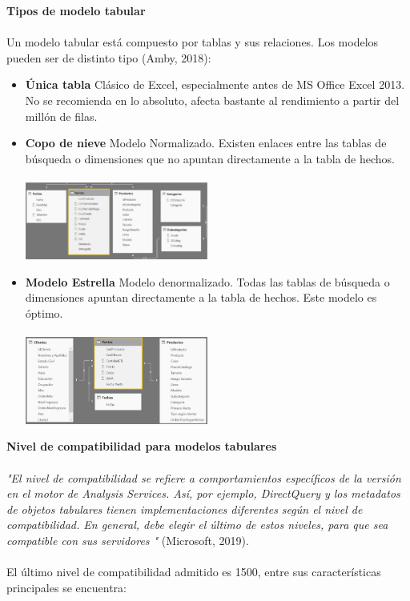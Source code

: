 \documentclass[twoside,twocolumn]{article}
\begin{document}
\begin{enumerate}
\textbf{Tipos de modelo tabular}
\\ \\
Un modelo tabular está compuesto por tablas y sus relaciones.  Los modelos pueden ser de distinto tipo (Amby, 2018):
\begin{itemize}
\item \textbf{Única tabla} Clásico de Excel, especialmente antes de MS Office Excel 2013.  No se recomienda en lo absoluto, afecta bastante al rendimiento a partir del millón de filas.\\
\item \textbf{Copo de nieve} Modelo Normalizado.  Existen enlaces entre las tablas de búsqueda o dimensiones que no apuntan directamente a la tabla de hechos.\\ \\
\includegraphics[width=6cm]{Imagenes/imagen1}\\
\item \textbf{Modelo Estrella} Modelo denormalizado.  Todas las tablas de búsqueda o dimensiones apuntan directamente a la tabla de hechos.  Este modelo es óptimo.\\ \\
\includegraphics[width=6cm]{Imagenes/imagen2}\\
\end{itemize}

\textbf{Nivel de compatibilidad para modelos tabulares}
\\ \\
\textit{"El nivel de compatibilidad se refiere a comportamientos específicos de la versión en el motor de Analysis Services.  Así, por ejemplo, DirectQuery y los metadatos de objetos tabulares tienen implementaciones diferentes según el nivel de compatibilidad.  En general, debe elegir el último de estos niveles, para que sea compatible con sus servidores "} (Microsoft, 2019). \\ \\
El último nivel de compatibilidad admitido es 1500, entre sus características principales se encuentra:  


\end{enumerate}
\end{document}
